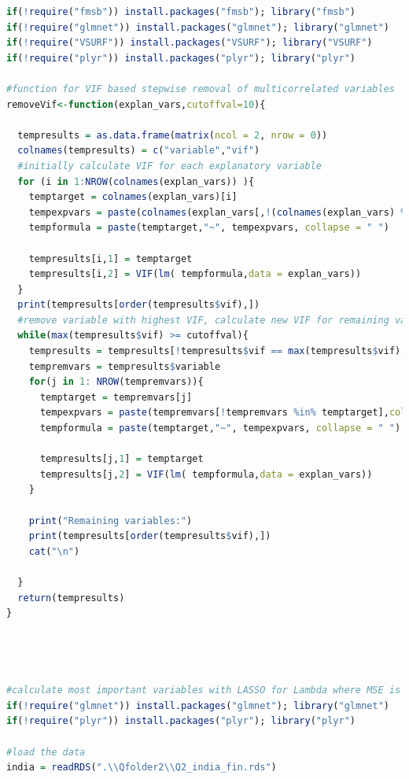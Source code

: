 \documentclass[11pt]{article}
\begin{document}
\begin{lstlisting}[language= R]
\end{lstlisting}



\begin{lstlisting}[language= R]
if(!require("fmsb")) install.packages("fmsb"); library("fmsb")
if(!require("glmnet")) install.packages("glmnet"); library("glmnet")
if(!require("VSURF")) install.packages("VSURF"); library("VSURF")
if(!require("plyr")) install.packages("plyr"); library("plyr")

#function for VIF based stepwise removal of multicorrelated variables
removeVif<-function(explan_vars,cutoffval=10){
 
  tempresults = as.data.frame(matrix(ncol = 2, nrow = 0))
  colnames(tempresults) = c("variable","vif")
  #initially calculate VIF for each explanatory variable
  for (i in 1:NROW(colnames(explan_vars)) ){
    temptarget = colnames(explan_vars)[i]
    tempexpvars = paste(colnames(explan_vars[,!(colnames(explan_vars) %in% temptarget)]),collapse = "+")
    tempformula = paste(temptarget,"~", tempexpvars, collapse = " ")
    
    tempresults[i,1] = temptarget 
    tempresults[i,2] = VIF(lm( tempformula,data = explan_vars))
  }
  print(tempresults[order(tempresults$vif),])
  #remove variable with highest VIF, calculate new VIF for remaining variables until all VIF are below cutoff value
  while(max(tempresults$vif) >= cutoffval){
    tempresults = tempresults[!tempresults$vif == max(tempresults$vif),]
    tempremvars = tempresults$variable
    for(j in 1: NROW(tempremvars)){
      temptarget = tempremvars[j]
      tempexpvars = paste(tempremvars[!tempremvars %in% temptarget],collapse = "+")
      tempformula = paste(temptarget,"~", tempexpvars, collapse = " ")
      
      tempresults[j,1] = temptarget 
      tempresults[j,2] = VIF(lm( tempformula,data = explan_vars))
    }
    
    print("Remaining variables:")
    print(tempresults[order(tempresults$vif),])
    cat("\n")
    
  }
  return(tempresults)
}




#calculate most important variables with LASSO for Lambda where MSE is minimal
if(!require("glmnet")) install.packages("glmnet"); library("glmnet")
if(!require("plyr")) install.packages("plyr"); library("plyr")

#load the data
india = readRDS(".\\Qfolder2\\Q2_india_fin.rds")


\end{lstlisting}
\end{document}

